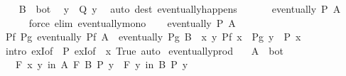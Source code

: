 \begin{isabellebody}
\ \ \isamarkupfalse%
\ {\isacartoucheopen}B\ {\isasymnoteq}\ bot{\isacartoucheclose}\ \isamarkupfalse%
\ y\ \ {\isachardoublequoteopen}Q\ y{\isachardoublequoteclose}\ \isamarkupfalse%
\ {\isacharparenleft}{\kern0pt}auto\ dest{\isacharcolon}{\kern0pt}\ eventually{\isacharunderscore}{\kern0pt}happens{\isacharparenright}{\kern0pt}\isanewline
\ \ \isamarkupfalse%
\ {\isacharasterisk}{\kern0pt}\ \isamarkupfalse%
\ {\isachardoublequoteopen}eventually\ P\ A{\isachardoublequoteclose}\isanewline
\ \ \ \ \isamarkupfalse%
\ {\isacharparenleft}{\kern0pt}force\ elim{\isacharcolon}{\kern0pt}\ eventually{\isacharunderscore}{\kern0pt}mono{\isacharparenright}{\kern0pt}\isanewline
{}\isamarkupfalse%
\isanewline
\ \ \isamarkupfalse%
\ {\isachardoublequoteopen}eventually\ P\ A{\isachardoublequoteclose}\isanewline
\ \ \isamarkupfalse%
\ \isamarkupfalse%
\ {\isachardoublequoteopen}{\isasymexists}Pf\ Pg{\isachardot}{\kern0pt}\ eventually\ Pf\ A\ {\isasymand}\ eventually\ Pg\ B\ {\isasymand}\ {\isacharparenleft}{\kern0pt}{\isasymforall}x\ y{\isachardot}{\kern0pt}\ Pf\ x\ {\isasymlongrightarrow}\ Pg\ y\ {\isasymlongrightarrow}\ P\ x{\isacharparenright}{\kern0pt}{\isachardoublequoteclose}\isanewline
\ \ \ \ \isamarkupfalse%
\ {\isacharparenleft}{\kern0pt}intro\ exI{\isacharbrackleft}{\kern0pt}of\ {\isacharunderscore}{\kern0pt}\ P{\isacharbrackright}{\kern0pt}\ exI{\isacharbrackleft}{\kern0pt}of\ {\isacharunderscore}{\kern0pt}\ {\isachardoublequoteopen}{\isasymlambda}x{\isachardot}{\kern0pt}\ True{\isachardoublequoteclose}{\isacharbrackright}{\kern0pt}{\isacharparenright}{\kern0pt}\ auto\isanewline
{}\isamarkupfalse%
%
\endisatagproof
{\isafoldproof}%
%
\isadelimproof
\isanewline
%
\endisadelimproof
\isanewline
{}\isamarkupfalse%
\ eventually{\isacharunderscore}{\kern0pt}prod{}{\isacharcolon}{\kern0pt}\isanewline
\ \ \ {\isachardoublequoteopen}A\ {\isasymnoteq}\ bot{\isachardoublequoteclose}\isanewline
\ \ \ {\isachardoublequoteopen}{\isacharparenleft}{\kern0pt}{\isasymforall}\isactrlsub F\ {\isacharparenleft}{\kern0pt}x{\isacharcomma}{\kern0pt}\ y{\isacharparenright}{\kern0pt}\ in\ A\ {\isasymtimes}\isactrlsub F\ B{\isachardot}{\kern0pt}\ P\ y{\isacharparenright}{\kern0pt}\ {\isasymlongleftrightarrow}\ {\isacharparenleft}{\kern0pt}{\isasymforall}\isactrlsub F\ y\ in\ B{\isachardot}{\kern0pt}\ P\ y{\isacharparenright}{\kern0pt}{\isachardoublequoteclose}\isanewline

\end{isabellebody}
